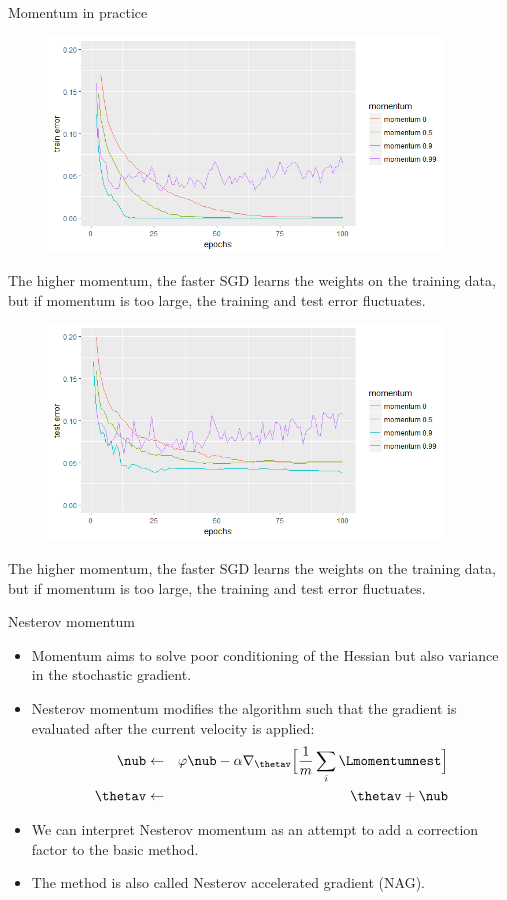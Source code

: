 \begin{vbframe}{Momentum in practice}
  \begin{figure}
  \begin{center}
    \includegraphics[width=10.5cm]{figure/momentum_train.png}
    \end{center}
  \end{figure}
    \small{The higher momentum, the faster SGD learns the weights on the training data, but if momentum is too large, the training and test error fluctuates.}

\framebreak

  \begin{figure}
  \centering
    \includegraphics[width=10.5cm]{figure/momentum_test.png}
  \end{figure}
      \small{The higher momentum, the faster SGD learns the weights on the training data, but if momentum is too large, the training and test error fluctuates.}
\end{vbframe}


\begin{vbframe}{Nesterov momentum}
  \begin{itemize}
    \item Momentum aims to solve poor conditioning of the Hessian but also variance in the stochastic gradient.
    \item Nesterov momentum modifies the algorithm such that the gradient is evaluated after the current velocity is applied:
      \begin{eqnarray*} 
        \nub &\leftarrow& \varphi \nub - \alpha \nabla_{\thetav} \Big[\frac{1}{m} \sum_{i} \Lmomentumnest \Big] \\
        \thetav &\leftarrow& \thetav + \nub
      \end{eqnarray*}
    \item We can interpret Nesterov momentum as an attempt to add a correction factor to the basic method.
    \item The method is also called Nesterov accelerated gradient (NAG).
  \end{itemize}
\end{vbframe}

